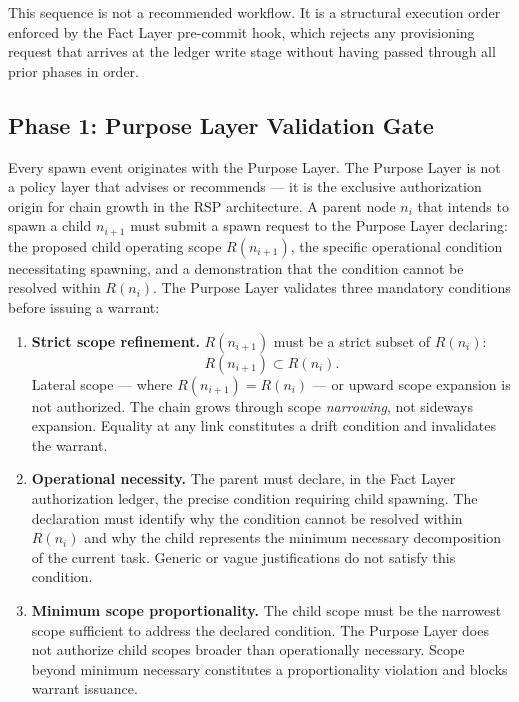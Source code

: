 This sequence is not a recommended workflow. It is a structural execution order enforced by the Fact Layer pre-commit hook, which rejects any provisioning request that arrives at the ledger write stage without having passed through all prior phases in order.

\subsection{Phase 1: Purpose Layer Validation Gate}

Every spawn event originates with the Purpose Layer. The Purpose Layer is not a policy layer that advises or recommends — it is the exclusive authorization origin for chain growth in the RSP architecture. A parent node $n_i$ that intends to spawn a child $n_{i+1}$ must submit a spawn request to the Purpose Layer declaring: the proposed child operating scope $R(n_{i+1})$, the specific operational condition necessitating spawning, and a demonstration that the condition cannot be resolved within $R(n_i)$. The Purpose Layer validates three mandatory conditions before issuing a warrant:

\begin{enumerate}
    \item[(P1)] \textbf{Strict scope refinement.} $R(n_{i+1})$ must be a strict subset of $R(n_i)$:
    \begin{equation}
    R(n_{i+1}) \subset R(n_i).
    \label{eq:scope-refinement}
    \end{equation}
    Lateral scope — where $R(n_{i+1}) = R(n_i)$ — or upward scope expansion is not authorized. The chain grows through scope \emph{narrowing}, not sideways expansion. Equality at any link constitutes a drift condition and invalidates the warrant.

    \item[(P2)] \textbf{Operational necessity.} The parent must declare, in the Fact Layer authorization ledger, the precise condition requiring child spawning. The declaration must identify why the condition cannot be resolved within $R(n_i)$ and why the child represents the minimum necessary decomposition of the current task. Generic or vague justifications do not satisfy this condition.

    \item[(P3)] \textbf{Minimum scope proportionality.} The child scope must be the narrowest scope sufficient to address the declared condition. The Purpose Layer does not authorize child scopes broader than operationally necessary. Scope beyond minimum necessary constitutes a proportionality violation and blocks warrant issuance.
\end{enumerate}

